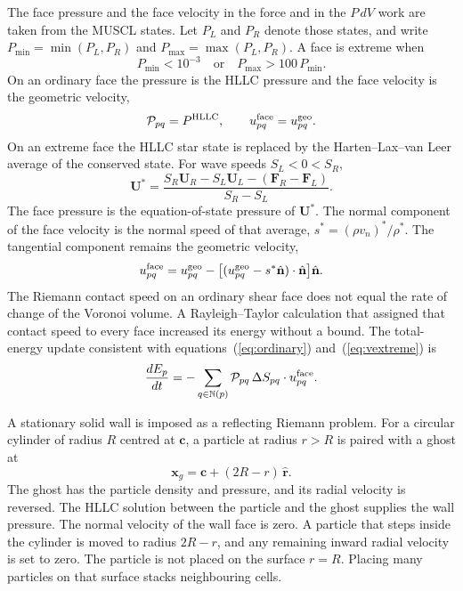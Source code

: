 \documentclass[twocolumn]{aastex63}
\newcommand{\vel}{{u}}
\newcommand{\surf}[0]{S}
\newcommand{\pressure}[0]{\mathcal{P}}
\begin{document}
The face pressure and the face velocity in the force and in the $P\,dV$ work are taken from the MUSCL states. Let $P_L$ and $P_R$ denote those states, and write $P_{\min}=\min(P_L,P_R)$ and $P_{\max}=\max(P_L,P_R)$. A face is extreme when
\begin{equation}
	P_{\min} < 10^{-3}
	\quad\text{or}\quad
	P_{\max} > 100\,P_{\min}.
	\label{eq:extreme}
\end{equation}
On an ordinary face the pressure is the HLLC pressure and the face velocity is the geometric velocity,
\begin{equation}
	\pressure_{pq} = P^{\rm HLLC},
	\qquad
	\vel_{pq}^{\rm face} = \vel_{pq}^{\rm geo}.
	\label{eq:ordinary}
\end{equation}
On an extreme face the HLLC star state is replaced by the Harten--Lax--van Leer average of the conserved state. For wave speeds $S_L<0<S_R$,
\begin{equation}
	\mathbf{U}^{*}
	= \frac{S_R\mathbf{U}_R - S_L\mathbf{U}_L - (\mathbf{F}_R-\mathbf{F}_L)}{S_R-S_L}.
	\label{eq:hll}
\end{equation}
The face pressure is the equation-of-state pressure of $\mathbf{U}^{*}$. The normal component of the face velocity is the normal speed of that average, $s^{*}=(\rho v_n)^{*}/\rho^{*}$. The tangential component remains the geometric velocity,
\begin{equation}
	\vel_{pq}^{\rm face}
	= \vel_{pq}^{\rm geo}
	  - \bigl[(\vel_{pq}^{\rm geo}-s^{*}\hat{\mathbf{n}})\cdot\hat{\mathbf{n}}\bigr]\hat{\mathbf{n}}.
	\label{eq:vextreme}
\end{equation}
The Riemann contact speed on an ordinary shear face does not equal the rate of change of the Voronoi volume. A Rayleigh--Taylor calculation that assigned that contact speed to every face increased its energy without a bound. The total-energy update consistent with equations~(\ref{eq:ordinary}) and~(\ref{eq:vextreme}) is
\begin{equation}
	\frac{dE_p}{dt}
	= -\sum_{q\in\mathbb{N}(p)}
	  \pressure_{pq}\,\Delta\surf_{pq}\cdot\vel_{pq}^{\rm face}.
	\label{eq:dEface}
\end{equation}

A stationary solid wall is imposed as a reflecting Riemann problem. For a circular cylinder of radius $R$ centred at $\mathbf{c}$, a particle at radius $r>R$ is paired with a ghost at
\begin{equation}
	\mathbf{x}_{g} = \mathbf{c} + (2R-r)\,\hat{\mathbf{r}}.
	\label{eq:ghost}
\end{equation}
The ghost has the particle density and pressure, and its radial velocity is reversed. The HLLC solution between the particle and the ghost supplies the wall pressure. The normal velocity of the wall face is zero. A particle that steps inside the cylinder is moved to radius $2R-r$, and any remaining inward radial velocity is set to zero. The particle is not placed on the surface $r=R$. Placing many particles on that surface stacks neighbouring cells.
\end{document}
